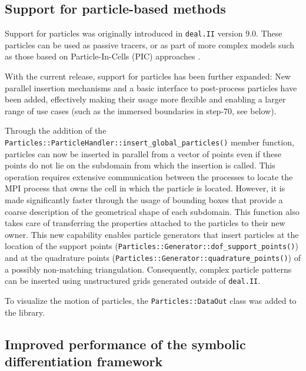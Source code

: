 \documentclass{ansarticle-preprint}
\newcommand{\specialword}[1]{\texttt{#1}}
\newcommand{\dealii}{{\specialword{deal.II}}\xspace}
\begin{document}
\subsection{Support for particle-based methods}
\label{subsec:particles}

Support for particles was originally introduced in \dealii{} version 9.0. These
particles can be used as passive tracers, or as part of more complex
models such as those based on Particle-In-Cells (PIC) approaches \cite{GLHPB18}.

With the current release, support for particles has been further expanded: New parallel
insertion mechanisms and a basic interface to post-process particles have
been added, effectively making their usage more flexible and enabling a larger
range of use cases (such as the immersed boundaries in step-70, see below).

Through the addition of the \texttt{Particles::ParticleHandler::insert\_global\_particles()} member function,
particles can now be inserted in parallel from a vector of points even if these points do not lie
on the subdomain from which the insertion is called. This operation requires extensive
communication between the processes to locate   the MPI process that
owns the cell in which the particle
is located. However, it is made significantly faster  through the usage of bounding boxes
that provide a coarse description of the geometrical shape of each subdomain.
This function also takes care of transferring the properties attached to the particles to their new owner.
This new capability enables particle generators that insert particles at the location
of the support points (\texttt{Particles::Generator::dof\_support\_points()}) and at the quadrature points (\texttt{Particles::Generator::quadrature\_points()}) of a
possibly non-matching triangulation. Consequently, complex particle patterns can be inserted
using unstructured grids generated outside of \dealii{}.

To visualize the motion of particles, the \texttt{Particles::DataOut} class was added to the library.






\subsection{Improved performance of the symbolic differentiation framework}
\label{subsec:symbdiff}
\end{document}
